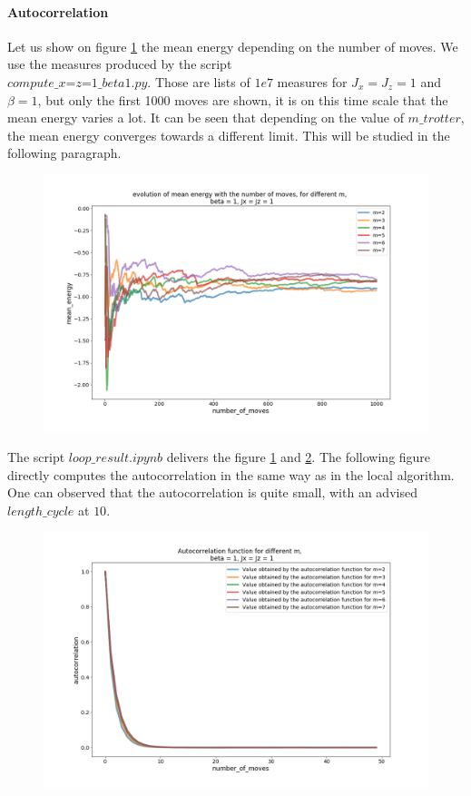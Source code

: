 \documentclass[a4paper,12pt,twoside]{article}
\begin{document}
	\paragraph{Autocorrelation}
	Let us show on figure \ref{meanenergylooplarger} the mean energy depending on the number of moves. We use the measures produced by the script \\ $compute\_x$=$z$=$1\_beta1.py$. Those are lists of $1e7$ measures for $J_x=J_z=1$ and $\beta=1$, but only the first 1000 moves are shown, it is on this time scale that the mean energy varies a lot. It can be seen that depending on the value of $m\_trotter$, the mean energy converges towards a different limit. This will be studied in the following paragraph. 
	\begin{figure}[!h]
		\centering
		\includegraphics[width=12cm]{mean_energy_evolution_loop_x=z=1_m2-7.png}
		\caption{ }
		\label{meanenergylooplarger}
	\end{figure}
	The script $loop\_result.ipynb$ delivers the figure \ref{meanenergylooplarger} and \ref{autocorrloopxy}. The following figure directly computes the autocorrelation in the same way as in the local algorithm. One can observed that the autocorrelation is quite small, with an advised $length\_cycle$ at $10$.
	\begin{figure}[!h]
		\centering
		\includegraphics[width=12cm]{autocorr_loop_x=y.png}
		\caption{ }
		\label{autocorrloopxy}
	\end{figure}
	
\end{document}
